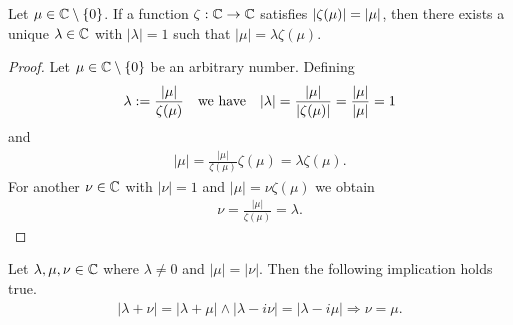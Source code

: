 \begin{lemma} \label{lemma:phase_adjustment_complex}
	Let $\mu \in \mathbb{C} \setminus \{0\}$. If a function $\zeta:\mathbb{C} \to \mathbb{C}$ satisfies ${\left | \zeta(\mu) \right |} = {\left | \mu \right |}$, then there exists a unique $\lambda \in \mathbb{C}$ with $|\lambda| = 1$ such that $|\mu| = \lambda \zeta(\mu)$. 
\end{lemma}

\begin{proof}
	Let $\mu \in \mathbb{C} \setminus \{0\}$ be an arbitrary number. Defining
	\begin{align*}
		\lambda := \frac{|\mu|}{\zeta(\mu)} \quad \text{we have} \quad |\lambda| = \frac{|\mu|}{|\zeta(\mu)|} = \frac{{\left | \mu \right |}}{{\left | \mu \right |}} = 1
	\end{align*}
	and
	\begin{align*}
		|\mu| = \frac{|\mu|}{\zeta(\mu)} \zeta(\mu) = \lambda \zeta(\mu).
	\end{align*}
	For another $\nu \in \mathbb{C}$ with $|\nu| = 1$ and $|\mu| = \nu \zeta(\mu)$ we obtain
	\begin{align*}
		\nu = \frac{|\mu|}{\zeta(\mu)} = \lambda.
	\end{align*}
\end{proof}

\begin{lemma} \label{lemma:complex_alg}
	Let $\lambda, \mu, \nu \in \mathbb{C}$ where $\lambda \neq 0$ and $|\mu| = |\nu|$. Then the following implication holds true. 
	\begin{align*}
		|\lambda + \nu| = |\lambda + \mu| \land |\lambda - i\nu| = |\lambda - i\mu| \Rightarrow \nu = \mu.
	\end{align*}
\end{lemma}

